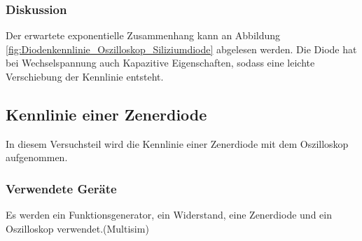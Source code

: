 \documentclass[12pt,a4paper]{article}
\begin{document}
\subsubsection{Diskussion}
Der erwartete exponentielle Zusammenhang kann an Abbildung \ref{fig:Diodenkennlinie_Oszilloskop_Siliziumdiode} abgelesen werden.
Die Diode hat bei Wechselspannung auch Kapazitive Eigenschaften, sodass eine leichte Verschiebung der Kennlinie entsteht.



\subsection{Kennlinie einer Zenerdiode}
In diesem Versuchsteil wird die Kennlinie einer Zenerdiode mit dem Oszilloskop aufgenommen.
\subsubsection{Verwendete Geräte}

Es werden ein Funktionsgenerator, ein Widerstand, eine Zenerdiode und ein Oszilloskop verwendet.(Multisim)
\end{document}

